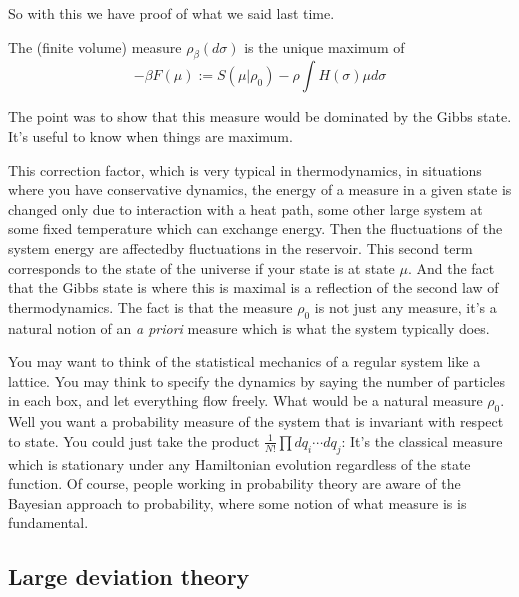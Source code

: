 So with this we have proof of what we said last time.

\begin{thm*}
The (finite volume)  measure $\rho_{\beta}(d\sigma)$ is the unique maximum of 
\[
-\beta F(\mu) := S(\mu|\rho_0) - \rho \int H(\sigma) \mu d\sigma
\]
\end{thm*}
The point was to show that this measure would be dominated by the Gibbs state. It's useful to know when things are maximum. 

This correction factor, which is very typical in thermodynamics, in situations where you have conservative dynamics, the energy of a measure in a given state is changed only due to interaction with a heat path, some other large system at some fixed temperature which can exchange energy. Then the fluctuations of the system energy are affectedby fluctuations in the reservoir. This second term corresponds to the state of the universe if your state is at state $\mu$. And the fact that the Gibbs state is where this is maximal is a reflection of the second law of thermodynamics. The fact is that the measure $\rho_0$ is not just any measure, it's a natural notion of an \textit{a priori} measure which is what the system typically does. 

You may want to think of the statistical mechanics of a regular system like a lattice. You may think to specify the dynamics by saying the number of particles in each box, and let everything flow freely. What would be a natural measure $\rho_0$. Well you want a probability measure of the system that is invariant with respect to state. You could just take the product $\frac{1}{N!}\prod dq_i \cdots dq_j$: It's the classical measure which is stationary under any Hamiltonian evolution regardless of the state function. Of course, people working in probability theory are aware of the Bayesian approach to probability, where some notion of what  measure is is fundamental. 


\subsection{Large deviation theory}

